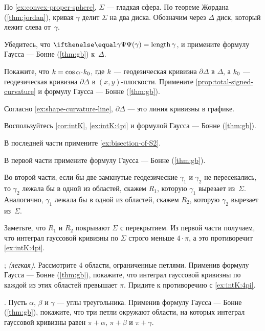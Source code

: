 \setcounter{eqtn}{0}

По \ref{ex:convex-proper-sphere}, $\Sigma$ --- гладкая сфера.
По теореме Жордана (\ref{thm:jordan}), кривая $\gamma$ делит $\Sigma$ на два диска.
Обозначим через $\Delta$ диск, который лежит слева от~$\gamma$.

Убедитесь, что $\tgc\gamma=\length\gamma$, и примените формулу Гаусса --- Бонне (\ref{thm:gb}) к~$\Delta$.

Покажите, что $\skur=\cos\alpha\cdot\skur_0$,
где $k$ --- геодезическая кривизна $\partial \Delta$ в $\Delta$,
а $k_0$ --- геодезическая кривизна $\partial \Delta$ в $(x,y)$-плоскости.
Примените \ref{prop:total-signed-curvature} и формулу Гаусса --- Бонне (\ref{thm:gb}).

Согласно \ref{ex:shape-curvature-line}, $\partial \Delta$ --- это линия кривизны в графике.

Воспользуйтесь \ref{cor:intK}, \ref{ex:intK:4pi} и формулой Гаусса --- Бонне (\ref{thm:gb}).

В последней части примените \ref{ex:bisection-of-S2}.

В первой части примените формулу Гаусса --- Бонне (\ref{thm:gb}).

Во второй части, если бы две замкнутые геодезические $\gamma_1$ и $\gamma_2$ не пересекались, то 
$\gamma_2$ лежала бы в одной из областей, скажем $R_1$, которую $\gamma_1$ вырезает из~$\Sigma$.
Аналогично, $\gamma_1$ лежала бы в одной из областей, скажем $R_2$, которую $\gamma_2$ вырезает из~$\Sigma$.

Заметьте, что $R_1$ и $R_2$ покрывают $\Sigma$ с перекрытием.
Из первой части получаем, что интеграл гауссовой кривизны по $\Sigma$ строго меньше $4\cdot\pi$, а это противоречит \ref{ex:intK:4pi}.

\parbf{\ref{ex:self-intersections}}; \textit{(легкая)}.
Рассмотрите $4$ области, ограниченные петлями.
Применив формулу Гаусса --- Бонне (\ref{thm:gb}), покажите, что интеграл гауссовой кривизны по каждой из этих областей превышает $\pi$.
Придите к противоречию с \ref{ex:intK:4pi}.

.
Пусть $\alpha$, $\beta$ и $\gamma$ --- углы треугольника.
Применив формулу Гаусса --- Бонне (\ref{thm:gb}), покажите, что три петли окружают области, на которых интеграл гауссовой кривизны равен $\pi+\alpha$, $\pi+\beta$ и $\pi+\gamma$.


